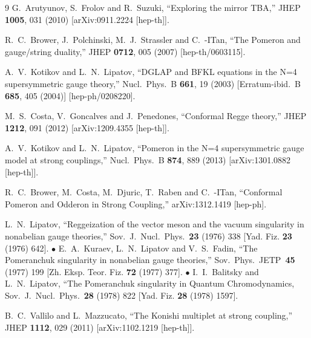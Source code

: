 \documentclass[a4paper,11pt]{article}
\numberwithin{equation}{section}
\begin{document}
\begin{thebibliography} {9}
  G.~Arutyunov, S.~Frolov and R.~Suzuki,
  ``Exploring the mirror TBA,''
  JHEP {\bf 1005}, 031 (2010)
  [arXiv:0911.2224 [hep-th]].

  R.~C.~Brower, J.~Polchinski, M.~J.~Strassler and C.~-ITan,
  ``The Pomeron and gauge/string duality,''
  JHEP {\bf 0712}, 005 (2007)
  [hep-th/0603115].

  A.~V.~Kotikov and L.~N.~Lipatov,
  ``DGLAP and BFKL equations in the N=4 supersymmetric gauge theory,''
  Nucl.\ Phys.\ B {\bf 661}, 19 (2003)
  [Erratum-ibid.\ B {\bf 685}, 405 (2004)]
  [hep-ph/0208220].

  M.~S.~Costa, V.~Goncalves and J.~Penedones,
  ``Conformal Regge theory,''
  JHEP {\bf 1212}, 091 (2012)
  [arXiv:1209.4355 [hep-th]].

  A.~V.~Kotikov and L.~N.~Lipatov,
  ``Pomeron in the N=4 supersymmetric gauge model at strong couplings,''
  Nucl.\ Phys.\ B {\bf 874}, 889 (2013)
  [arXiv:1301.0882 [hep-th]].

  R.~C.~Brower, M.~Costa, M.~Djuric, T.~Raben and C.~-ITan,
  ``Conformal Pomeron and Odderon in Strong Coupling,''
  arXiv:1312.1419 [hep-ph].

  L.~N.~Lipatov, ``Reggeization of the vector meson and the vacuum singularity in nonabelian gauge theories,'' Sov.\ J.\ Nucl.\ Phys.\ {\bf 23} (1976) 338 [Yad. Fiz. {\bf 23} (1976) 642]. $\bullet$
  E.~A.~Kuraev, L.~N.~Lipatov and V.~S.~Fadin, ``The Pomeranchuk singularity in nonabelian gauge theories,'' Sov.\ Phys.\ JETP\ {\bf 45} (1977) 199 [Zh. Eksp. Teor. Fiz. {\bf 72} (1977) 377]. $\bullet$
  I.~I.~Balitsky and L.~N.~Lipatov, ``The Pomeranchuk singularity in Quantum Chromodynamics,\\ Sov.\ J.\ Nucl.\ Phys.\ {\bf 28} (1978) 822 [Yad. Fiz. {\bf 28} (1978) 1597].

  B.~C.~Vallilo and L.~Mazzucato,
  ``The Konishi multiplet at strong coupling,''
  JHEP {\bf 1112}, 029 (2011)
  [arXiv:1102.1219 [hep-th]].


\end{thebibliography}
\end{document}
